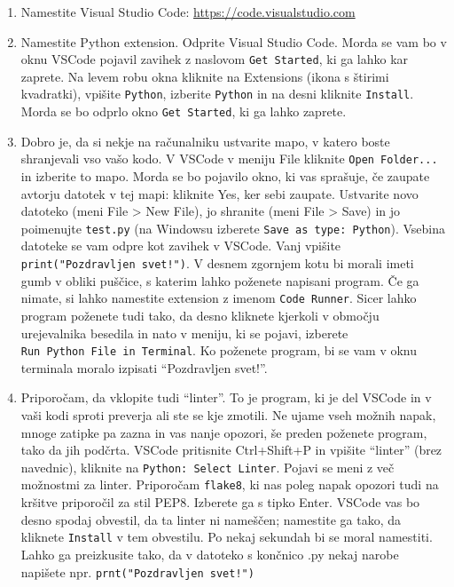 \documentclass[
]{report}
\providecommand{\tightlist}{%
  \setlength{\itemsep}{0pt}\setlength{\parskip}{0pt}}
\begin{document}
\begin{enumerate}
\def\labelenumi{\arabic{enumi}.}
\setcounter{enumi}{2}
\tightlist
\item
  Namestite Visual Studio Code: \url{https://code.visualstudio.com}
\item
  Namestite Python extension. Odprite Visual Studio Code. Morda se vam bo v oknu VSCode pojavil zavihek z naslovom \texttt{Get\ Started}, ki ga lahko kar zaprete.
  Na levem robu okna kliknite na Extensions (ikona s štirimi kvadratki), vpišite \texttt{Python},
  izberite \texttt{Python} in na desni kliknite \texttt{Install}. Morda se bo odprlo okno
  \texttt{Get\ Started}, ki ga lahko zaprete.
\item
  Dobro je, da si nekje na računalniku ustvarite mapo, v katero boste shranjevali
  vso vašo kodo. V VSCode v meniju File kliknite \texttt{Open\ Folder...} in izberite to mapo.
  Morda se bo pojavilo okno, ki vas sprašuje, če zaupate avtorju datotek
  v tej mapi: kliknite Yes, ker sebi zaupate. Ustvarite novo datoteko
  (meni File \textgreater{} New File), jo shranite (meni File \textgreater{} Save) in jo poimenujte
  \texttt{test.py} (na Windowsu izberete \texttt{Save\ as\ type:\ Python}). Vsebina datoteke se vam
  odpre kot zavihek v VSCode. Vanj vpišite \texttt{print("Pozdravljen\ svet!")}. V desnem
  zgornjem kotu bi morali imeti gumb v obliki puščice, s katerim lahko poženete napisani program.
  Če ga nimate, si lahko namestite extension z imenom \texttt{Code\ Runner}. Sicer lahko
  program poženete tudi tako, da desno kliknete kjerkoli v območju urejevalnika besedila in nato v
  meniju, ki se pojavi, izberete \texttt{Run\ Python\ File\ in\ Terminal}. Ko poženete program,
  bi se vam v oknu terminala moralo izpisati ``Pozdravljen svet!''.
\item
  Priporočam, da vklopite tudi ``linter''. To je program, ki je del VSCode in
  v vaši kodi sproti preverja ali ste se kje zmotili. Ne ujame vseh možnih napak,
  mnoge zatipke pa zazna in vas nanje opozori, še preden poženete program, tako da jih podčrta.
  VSCode pritisnite Ctrl+Shift+P in vpišite ``linter'' (brez navednic), kliknite na
  \texttt{Python:\ Select\ Linter}. Pojavi se meni z več možnostmi za linter.
  Priporočam \texttt{flake8}, ki nas poleg napak opozori tudi na kršitve priporočil za stil
  PEP8. Izberete ga s tipko Enter. VSCode vas bo desno spodaj obvestil, da ta linter ni nameščen;
  namestite ga tako, da kliknete \texttt{Install} v tem obvestilu. Po nekaj sekundah bi se moral namestiti. Lahko ga preizkusite tako, da v datoteko s končnico .py nekaj narobe napišete npr. \texttt{prnt("Pozdravljen\ svet!")}
\end{enumerate}
\end{document}

